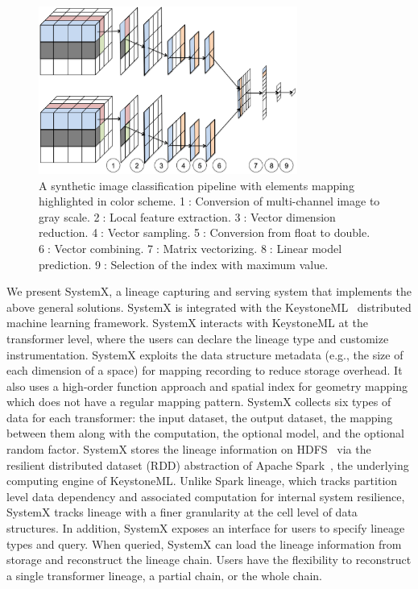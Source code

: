 \documentclass{sig-alternate}
\begin{document}
\begin{figure}[t]
\begin{center}
    \includegraphics[width=85mm]{pictures/Conceptual}
    \caption {A synthetic image classification pipeline with elements mapping highlighted in color scheme. 
    \textcircled{1}: Conversion of multi-channel image to gray scale.
    \textcircled{2}: Local feature extraction.
    \textcircled{3}: Vector dimension reduction.
    \textcircled{4}: Vector sampling.
    \textcircled{5}: Conversion from float to double.
    \textcircled{6}: Vector combining.
    \textcircled{7}: Matrix vectorizing.
    \textcircled{8}: Linear model prediction.
    \textcircled{9}: Selection of the index with maximum value.
    \label{fig:conceptual}
}
\end{center}
\end{figure}


We present SystemX, a lineage capturing and serving system that implements the above general solutions.
SystemX is integrated with the KeystoneML~\cite{sparks15} distributed machine learning framework.
SystemX interacts with KeystoneML at the transformer level, where the users can declare the lineage type and customize instrumentation.
SystemX exploits the  data structure metadata (e.g., the size of each dimension of a space) for mapping recording to reduce storage overhead.
It also uses a high-order function approach and spatial index for geometry mapping which does not have a regular mapping pattern.
SystemX collects six types of data for each transformer: the input dataset, the output dataset, the mapping between them
along with the computation, the optional model, and the optional random factor.
SystemX stores the lineage information on HDFS~\cite{shvachko10} via the resilient distributed dataset (RDD) abstraction
of Apache Spark~\cite{zaharia12}, the underlying computing engine of KeystoneML.
Unlike Spark lineage, which tracks partition level data dependency and associated computation for internal system resilience,
SystemX tracks lineage with a finer granularity at the cell level of data structures.
In addition, SystemX exposes an interface for users to specify lineage types and query.
When queried, SystemX can load the lineage information from storage and reconstruct the lineage chain.
Users have the flexibility to reconstruct a single transformer lineage, a partial chain, or the whole chain.
\end{document}
